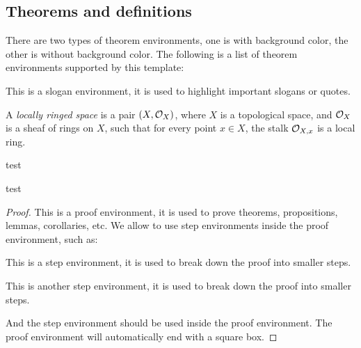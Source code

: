\subsection{Theorems and definitions}\label{subsec:theorems_and_definitions}
    
    There are two types of theorem environments, one is with background color, the other is without background color. 
    The following is a list of theorem environments supported by this template:
    
    \begin{slogan}
        This is a slogan environment, it is used to highlight important slogans or quotes.
    \end{slogan}

    \begin{definition}
        A \emph{locally ringed space} is a pair \((X, {\mathcal{O}}_X)\), where \(X\) is a topological space, and \({\mathcal{O}}_X\) is a sheaf of rings on \(X\), such that for every point \(x \in X\), the stalk \({\mathcal{O}}_{X,x}\) is a local ring.
    \end{definition}

    \begin{construction}
        test
    \end{construction}

    \begin{proposition}
        test 
    \end{proposition}
    \begin{proof}
        This is a proof environment, it is used to prove theorems, propositions, lemmas, corollaries, etc.
        We allow to use step environments inside the proof environment, such as:
        \begin{step}\label{step:1_in_proof_1}
            This is a step environment, it is used to break down the proof into smaller steps.
        \end{step}
        \begin{step}\label{step:2_in_proof_1}
            This is another step environment, it is used to break down the proof into smaller steps.
        \end{step}
        And the step environment should be used inside the proof environment.
        The proof environment will automatically end with a square box.
    \end{proof}
    
